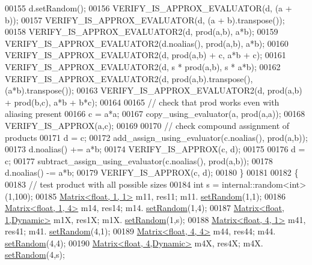 \begin{DoxyCode}
00155     d.setRandom();
00156     VERIFY\_IS\_APPROX\_EVALUATOR(d, (a + b));
00157     VERIFY\_IS\_APPROX\_EVALUATOR(d, (a + b).transpose());
00158     VERIFY\_IS\_APPROX\_EVALUATOR2(d, prod(a,b), a*b);
00159     VERIFY\_IS\_APPROX\_EVALUATOR2(d.noalias(), prod(a,b), a*b);
00160     VERIFY\_IS\_APPROX\_EVALUATOR2(d, prod(a,b) + c, a*b + c);
00161     VERIFY\_IS\_APPROX\_EVALUATOR2(d, s * prod(a,b), s * a*b);
00162     VERIFY\_IS\_APPROX\_EVALUATOR2(d, prod(a,b).transpose(), (a*b).transpose());
00163     VERIFY\_IS\_APPROX\_EVALUATOR2(d, prod(a,b) + prod(b,c), a*b + b*c);
00164 
00165     \textcolor{comment}{// check that prod works even with aliasing present}
00166     c = a*a;
00167     copy\_using\_evaluator(a, prod(a,a));
00168     VERIFY\_IS\_APPROX(a,c);
00169 
00170     \textcolor{comment}{// check compound assignment of products}
00171     d = c;
00172     add\_assign\_using\_evaluator(c.noalias(), prod(a,b));
00173     d.noalias() += a*b;
00174     VERIFY\_IS\_APPROX(c, d);
00175 
00176     d = c;
00177     subtract\_assign\_using\_evaluator(c.noalias(), prod(a,b));
00178     d.noalias() -= a*b;
00179     VERIFY\_IS\_APPROX(c, d);
00180   \}
00181 
00182   \{
00183     \textcolor{comment}{// test product with all possible sizes}
00184     \textcolor{keywordtype}{int} s = internal::random<int>(1,100);
00185     \hyperlink{group___core___module_class_eigen_1_1_matrix}{Matrix<float,      1,      1>} m11, res11;  m11.
      \hyperlink{class_eigen_1_1_plain_object_base_af0e576a0e1aefc9ee346de44cc352ba3}{setRandom}(1,1);
00186     \hyperlink{group___core___module_class_eigen_1_1_matrix}{Matrix<float,      1,      4>} m14, res14;  m14.
      \hyperlink{class_eigen_1_1_plain_object_base_af0e576a0e1aefc9ee346de44cc352ba3}{setRandom}(1,4);
00187     \hyperlink{group___core___module_class_eigen_1_1_matrix}{Matrix<float,      1,Dynamic>} m1X, res1X;  m1X.
      \hyperlink{class_eigen_1_1_plain_object_base_af0e576a0e1aefc9ee346de44cc352ba3}{setRandom}(1,s);
00188     \hyperlink{group___core___module_class_eigen_1_1_matrix}{Matrix<float,      4,      1>} m41, res41;  m41.
      \hyperlink{class_eigen_1_1_plain_object_base_af0e576a0e1aefc9ee346de44cc352ba3}{setRandom}(4,1);
00189     \hyperlink{group___core___module_class_eigen_1_1_matrix}{Matrix<float,      4,      4>} m44, res44;  m44.
      \hyperlink{class_eigen_1_1_plain_object_base_af0e576a0e1aefc9ee346de44cc352ba3}{setRandom}(4,4);
00190     \hyperlink{group___core___module_class_eigen_1_1_matrix}{Matrix<float,      4,Dynamic>} m4X, res4X;  m4X.
      \hyperlink{class_eigen_1_1_plain_object_base_af0e576a0e1aefc9ee346de44cc352ba3}{setRandom}(4,s);

\end{DoxyCode}
